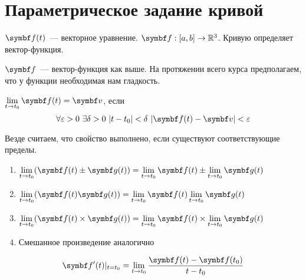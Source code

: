 \documentclass[main]{subfiles}
\begin{document}
\section{Параметрическое задание кривой}
$\vf (t)$~--- векторное уравнение. $\vf: [a,b] \to \R^3$.
Кривую определяет вектор-функция.

\begin{definition}
    $\vf$~--- вектор-функция как выше.
    На протяжении всего курса предполагаем, что у функции необходимая нам гладкость.
\end{definition}

\begin{definition}
    $\displaystyle \lim_{t \to t_0} \vf (t) = \vv$, если
    \[\forall \epsilon > 0 \ \exists \delta > 0 \ |t - t_0| < \delta \ |\vf(t) - \vv| < \epsilon\]
\end{definition}
\begin{propertylist}
    Везде считаем, что свойство выполнено, если существуют соответствующие пределы.
    \begin{enumerate}
        \item $\displaystyle \lim_{t \to t_0} ( \vf(t) \pm \vg (t))= \lim_{t \to t_0} \vf(t) \pm \lim_{t \to t_0} \vg (t) $
        \item $\displaystyle \lim_{t \to t_0} ( \vf(t) \vg (t))= \lim_{t \to t_0} \vf(t) \lim_{t \to t_0} \vg (t) $
        \item $\displaystyle \lim_{t \to t_0} ( \vf(t) \times \vg (t))= \lim_{t \to t_0} \vf(t) \times \lim_{t \to t_0} \vg (t) $
        \item Смешанное произведение аналогично
    \end{enumerate}
\end{propertylist}

\begin{definition}
    \[\vf'(t)\rvert_{t=t_0} =  \lim_{t \to t_0} \frac{\vf(t) - \vf(t_0)}{t - t_0}\]
\end{definition}
\end{document}
